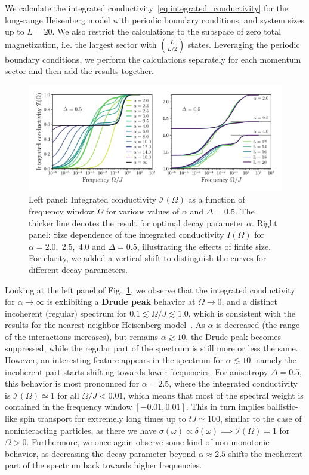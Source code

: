 We calculate the integrated conductivity~\eqref{eq:integrated_conductivity} for the long-range Heisenberg model
with periodic boundary conditions, and system sizes up to \(L=20\). We also restrict the calculations to the
subspace of zero total magnetization, i.e. the largest sector with \(\binom{L}{L/2}\) states. Leveraging
the periodic boundary conditions, we perform the calculations separately for each momentum sector and then
add the results together.
\begin{figure}[htbp]
  \centering
  \includegraphics[width=\linewidth]{Figures/optical_conductivity.pdf}
  \caption{Left panel: Integrated conductivity \(\mathcal{I}(\Omega)\) as a function of frequency window \(\Omega\) for various values of \(\alpha\)
    and \(\Delta = 0.5\). The thicker line denotes the result for optimal decay parameter \(\alpha\). Right panel: Size dependence
    of the integrated conductivity \(I(\Omega)\) for \(\alpha = 2.0, \; 2.5,\; 4.0\) and \(\Delta = 0.5\),
    illustrating the effects of finite size. For clarity, we added a vertical shift to distinguish the curves for different
    decay parameters.}
  \label{fig:optical_conductivity}
\end{figure}
Looking at the left panel of Fig.~\ref{fig:optical_conductivity}, we observe that the integrated conductivity
for \(\alpha \to \infty\) is exhibiting a \textbf{Drude peak} behavior at \(\Omega \to 0\), and a distinct
incoherent (regular) spectrum for \(0.1 \lesssim \Omega / J \lesssim 1.0\), which is consistent with the results
for the nearest neighbor Heisenberg model~\autocite{Prelovsek2021}. As \(\alpha\) is decreased
(the range of the interactions increases), but remains \(\alpha \gtrsim 10\), the Drude peak
becomes suppressed, while the regular part of the spectrum is still more or less the same.
However, an interesting feature appears in the spectrum for \(\alpha \lesssim 10\), namely
the incoherent part starts shifting towards lower frequencies. For anisotropy \(\Delta = 0.5\),
this behavior is most pronounced for \(\alpha = 2.5\), where the integrated conductivity
is \(\mathcal{I}(\Omega)\simeq 1 \) for all \( \Omega/J < 0.01\), which means that most of the spectral weight
is contained in the frequency window \(\left[-0.01,0.01\right]\). This in turn implies ballistic-like
spin transport for extremely long times up to \(tJ \simeq 100\), similar to the case of noninteracting particles,
as there we have \(\sigma(\omega) \propto \delta(\omega) \implies \mathcal{I} (\Omega) = 1\) for \(\Omega > 0\). Furthermore,
we once again observe some kind of non-monotonic behavior, as decreasing the decay parameter
beyond \(\alpha \approx 2.5\) shifts the incoherent part of the spectrum back towards higher frequencies.


